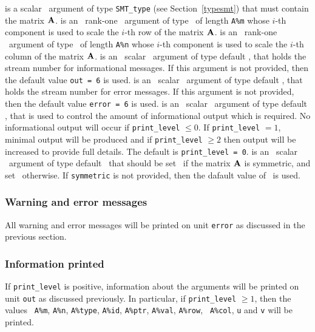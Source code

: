\documentclass{galahad}
\begin{document}
\vspace*{-1mm}
\begin{description}
   is a scalar \intentinout\ argument of type {\tt SMT\_type} (see
     Section~\ref{typesmt}) that must contain the matrix ${\mathbf{A}}$.
   is an \optional\ rank-one \intentin\ argument of type \realdp\ of length
     {\tt A\%m} whose $i$-th component is used to scale the $i$-th
     row of the matrix ${\mathbf{A}}$.
   is an \optional\ rank-one \intentin\ argument of type \realdp\ of length
     {\tt A\%n} whose $i$-th component is used to scale the $i$-th
     column of the matrix ${\mathbf{A}}$.
   is an \optional\ scalar \intentin\ argument of type default \integer, that holds the
     stream number for informational messages. If this argument is not
     provided, then the default value {\tt out = 6} is used.
   is an \optional\ scalar \intentin\ argument of type default \integer, that holds the
     stream number for error messages. If this argument is not
     provided, then the default value {\tt error = 6} is used.
   is an \optional\ scalar \intentin\ argument of type default \integer, that is used
     to control the amount of informational output which is required. No 
     informational output will occur if {\tt print\_level} $\leq 0$. If 
     {\tt print\_level} $= 1$, minimal output will be produced and if
     {\tt print\_level} $\geq 2$ then output will be
     increased to provide full details.
     The default is {\tt print\_level = 0}.
   is an \optional\ scalar \intentin\ argument of type default
     \logical\ that should be set \true\ if the matrix ${\mathbf{A}}$ is
     symmetric, and set \false\ otherwise.  If {\tt symmetric} is not
     provided, then the dafault value of \false\ is used. 
\end{description}

\subsubsection{Warning and error messages}\label{scaleA-error}

All warning and error messages will be printed on unit {\tt error} as
discussed in the previous section.

\subsubsection{Information printed}\label{scaleA-info}

If {\tt print\_level} is positive, information about the arguments
will be printed on unit {\tt out} as discussed previously.  In
particular, if {\tt print\_level} $\geq 1$, then the values {\tt
  A\%m}, {\tt A\%n}, {\tt A\%type}, {\tt A\%id},
{\tt A\%ptr}, {\tt A\%val}, {\tt A\%row}, {\tt
  A\%col}, {\tt u} and {\tt v} will be printed.
\end{document}
